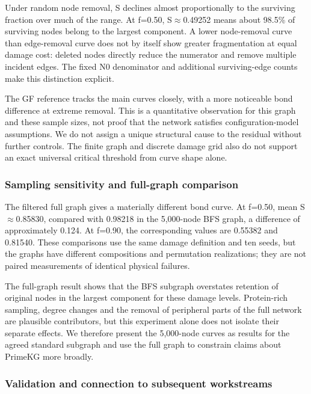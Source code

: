 Under random node removal, S declines almost proportionally to the
surviving fraction over much of the range. At f=0.50, S$\approx$0.49252 means
about 98.5\% of surviving nodes belong to the largest component. A lower
node-removal curve than edge-removal curve does not by itself show
greater fragmentation at equal damage cost: deleted nodes directly
reduce the numerator and remove multiple incident edges. The fixed N0
denominator and additional surviving-edge counts make this distinction
explicit.

The GF reference tracks the main curves closely, with a more noticeable
bond difference at extreme removal. This is a quantitative observation
for this graph and these sample sizes, not proof that the network
satisfies configuration-model assumptions. We do not assign a unique
structural cause to the residual without further controls. The finite
graph and discrete damage grid also do not support an exact universal
critical threshold from curve shape alone.

\subsubsection{Sampling sensitivity and full-graph
comparison}\label{sampling-sensitivity-and-full-graph-comparison}

The filtered full graph gives a materially different bond curve. At
f=0.50, mean S$\approx$0.85830, compared with 0.98218 in the 5,000-node BFS
graph, a difference of approximately 0.124. At f=0.90, the corresponding
values are 0.55382 and 0.81540. These comparisons use the same damage
definition and ten seeds, but the graphs have different compositions and
permutation realizations; they are not paired measurements of identical
physical failures.

The full-graph result shows that the BFS subgraph overstates retention
of original nodes in the largest component for these damage levels.
Protein-rich sampling, degree changes and the removal of peripheral
parts of the full network are plausible contributors, but this
experiment alone does not isolate their separate effects. We therefore
present the 5,000-node curves as results for the agreed standard
subgraph and use the full graph to constrain claims about PrimeKG more
broadly.

\subsubsection{Validation and connection to subsequent
workstreams}\label{validation-and-connection-to-subsequent-workstreams}

